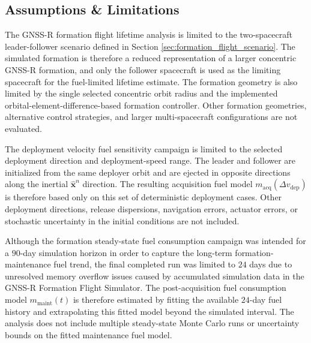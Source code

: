\subsection{Assumptions \& Limitations}
\label{sec:lifetime_limitations}
The GNSS-R formation flight lifetime analysis is limited to the two-spacecraft leader-follower scenario defined in Section \ref{sec:formation_flight_scenario}. The simulated formation is therefore a reduced representation of a larger concentric GNSS-R formation, and only the follower spacecraft is used as the limiting spacecraft for the fuel-limited lifetime estimate. The formation geometry is also limited by the single selected concentric orbit radius and the implemented orbital-element-difference-based formation controller. Other formation geometries, alternative control strategies, and larger multi-spacecraft configurations are not evaluated.

The deployment velocity fuel sensitivity campaign is limited to the selected deployment direction and deployment-speed range. The leader and follower are initialized from the same deployer orbit and are ejected in opposite directions along the inertial $\hat{\mathbf{x}}^n$ direction. The resulting acquisition fuel model $m_{\mathrm{acq}}(\Delta v_{\mathrm{dep}})$ is therefore based only on this set of deterministic deployment cases. Other deployment directions, release dispersions, navigation errors, actuator errors, or stochastic uncertainty in the initial conditions are not included.

Although the formation steady-state fuel consumption campaign was intended for a $90$-day simulation horizon in order to capture the long-term formation-maintenance fuel trend, the final completed run was limited to $24$ days due to unresolved memory overflow issues caused by accumulated simulation data in the GNSS-R Formation Flight Simulator. The post-acquisition fuel consumption model $m_{\mathrm{maint}}(t)$ is therefore estimated by fitting the available $24$-day fuel history and extrapolating this fitted model beyond the simulated interval. The analysis does not include multiple steady-state Monte Carlo runs or uncertainty bounds on the fitted maintenance fuel model.

